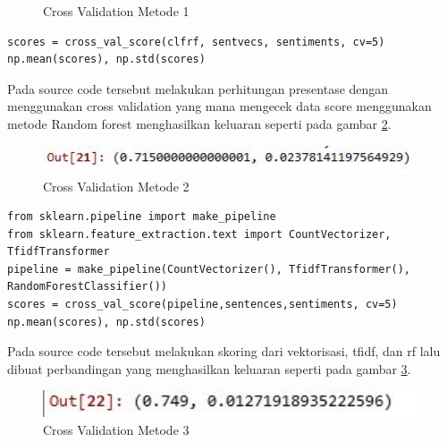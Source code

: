 \begin{enumerate}
\begin{figure}[!htbp]
	\caption{Cross Validation Metode 1}
	\label{c5_28}
\end{figure}
\begin{verbatim}
scores = cross_val_score(clfrf, sentvecs, sentiments, cv=5)
np.mean(scores), np.std(scores)
\end{verbatim}
\subitem Pada source code tersebut melakukan perhitungan presentase dengan menggunakan cross validation yang mana mengecek data score menggunakan metode Random forest menghasilkan keluaran seperti pada gambar \ref{c5_29}.
\begin{figure}[!htbp]
	\centerline{\includegraphics[width=1\textwidth]{figures/huda/chapter5/29.JPG}}
	\caption{Cross Validation Metode 2}
	\label{c5_29}
\end{figure}
\begin{verbatim}
from sklearn.pipeline import make_pipeline
from sklearn.feature_extraction.text import CountVectorizer, TfidfTransformer
pipeline = make_pipeline(CountVectorizer(), TfidfTransformer(), RandomForestClassifier())
scores = cross_val_score(pipeline,sentences,sentiments, cv=5)
np.mean(scores), np.std(scores)
\end{verbatim}
\subitem Pada source code tersebut melakukan skoring dari vektorisasi, tfidf, dan rf lalu dibuat perbandingan yang menghasilkan keluaran seperti pada gambar \ref{c5_30}.
\begin{figure}[!htbp]
	\centerline{\includegraphics[width=1\textwidth]{figures/huda/chapter5/30.JPG}}
	\caption{Cross Validation Metode 3}
	\label{c5_30}
\end{figure}
\end{enumerate}

